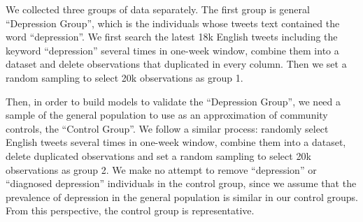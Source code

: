 \documentclass[]{article}
\newenvironment{Shaded}{\begin{snugshade}}{\end{snugshade}}
\newcommand{\DataTypeTok}[1]{\textcolor[rgb]{0.13,0.29,0.53}{#1}}
\newcommand{\DecValTok}[1]{\textcolor[rgb]{0.00,0.00,0.81}{#1}}
\newcommand{\KeywordTok}[1]{\textcolor[rgb]{0.13,0.29,0.53}{\textbf{#1}}}
\newcommand{\NormalTok}[1]{#1}
\newcommand{\OperatorTok}[1]{\textcolor[rgb]{0.81,0.36,0.00}{\textbf{#1}}}
\newcommand{\OtherTok}[1]{\textcolor[rgb]{0.56,0.35,0.01}{#1}}
\newcommand{\StringTok}[1]{\textcolor[rgb]{0.31,0.60,0.02}{#1}}
\begin{document}
We collected three groups of data separately. The first group is general
``Depression Group'', which is the individuals whose tweets text
contained the word ``depression''. We first search the latest 18k
English tweets including the keyword ``depression'' several times in
one-week window, combine them into a dataset and delete observations
that duplicated in every column. Then we set a random sampling to select
20k observations as group 1.

\begin{Shaded}
\end{Shaded}

Then, in order to build models to validate the ``Depression Group'', we
need a sample of the general population to use as an approximation of
community controls, the ``Control Group''. We follow a similar process:
randomly select English tweets several times in one-week window, combine
them into a dataset, delete duplicated observations and set a random
sampling to select 20k observations as group 2. We make no attempt to
remove ``depression'' or ``diagnosed depression'' individuals in the
control group, since we assume that the prevalence of depression in the
general population is similar in our control groups. From this
perspective, the control group is representative.
\end{document}
